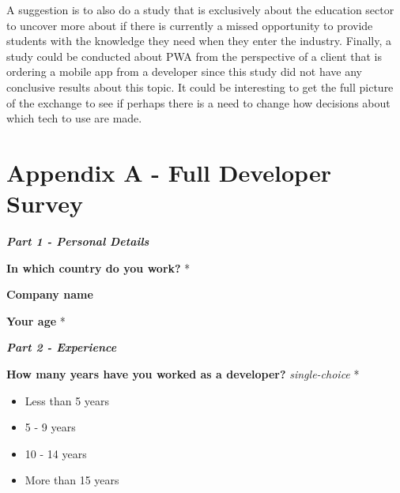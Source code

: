 \documentclass[a4paper,12pt]{article}
\renewcommand{\arraystretch}{1.5}
\begin{document}
A suggestion is to also do a study that is exclusively about the education sector to uncover more about if there is currently a missed opportunity to provide students with the knowledge they need when they enter the industry.
Finally, a study could be conducted about PWA from the perspective of a client that is ordering a mobile app from a developer since this study did not have any conclusive results about this topic. It could be interesting to get the full picture of the exchange to see if perhaps there is a need to change how decisions about which tech to use are made.

\newpage
\hypersetup{urlcolor=black}
%
%
\printbibliography[heading=bibintoc]

\newpage
\setcounter{page}{1} %
\appendix

\setlength{\parindent}{0pt}
\setlength{\arrayrulewidth}{0.3mm}
\setlength{\tabcolsep}{4pt}
\renewcommand{\arraystretch}{1.5}

\section{Appendix A - Full Developer Survey}
\label{Appendix_devSurvey}

\textbf{\textit{Part 1 - Personal Details}}

\textbf{In which country do you work?} *

\quad

\textbf{Company name}

\quad

\textbf{Your age} *

\quad

\quad

\textbf{\textit{Part 2 - Experience}}

\textbf{How many years have you worked as a developer?} \textit{single-choice} *
\begin{itemize}
    \item Less than 5 years
    \item 5 - 9 years
    \item 10 - 14 years
    \item More than 15 years
\end{itemize}
\end{document}
